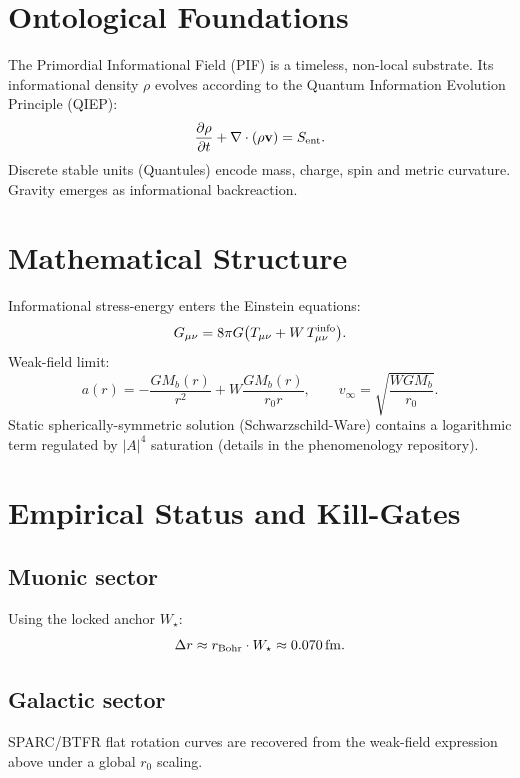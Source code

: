 \documentclass[11pt]{article}
\begin{document}
\section{Ontological Foundations}
The Primordial Informational Field (PIF) is a timeless, non-local substrate. Its informational density $\rho$ evolves according to the Quantum Information Evolution Principle (QIEP):
\begin{equation}
\frac{\partial \rho}{\partial t} + \nabla \cdot (\rho \mathbf{v}) = S_{\rm ent}.
\end{equation}
Discrete stable units (Quantules) encode mass, charge, spin and metric curvature. Gravity emerges as informational backreaction.

\section{Mathematical Structure}
Informational stress-energy enters the Einstein equations:
\begin{equation}
G_{\mu\nu} = 8\pi G \bigl(T_{\mu\nu} + W\, T_{\mu\nu}^{\rm info}\bigr).
\end{equation}
Weak-field limit:
\begin{equation}
a(r) = -\frac{G M_b(r)}{r^2} + W \frac{G M_b(r)}{r_0 r}, \qquad
v_\infty = \sqrt{\frac{W G M_b}{r_0}}.
\end{equation}
Static spherically-symmetric solution (Schwarzschild-Ware) contains a logarithmic term regulated by $|A|^4$ saturation (details in the phenomenology repository).

\section{Empirical Status and Kill-Gates}
\subsection{Muonic sector}
Using the locked anchor $W_\star$:
\begin{equation}
\Delta r \approx r_{\rm Bohr}\cdot W_\star \approx 0.070\,\mathrm{fm}.
\end{equation}

\subsection{Galactic sector}
SPARC/BTFR flat rotation curves are recovered from the weak-field expression above under a global $r_0$ scaling.
\end{document}
